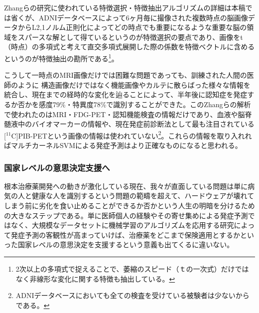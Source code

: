 Zhangらの研究に使われている特徴選択・特徴抽出アルゴリズムの詳細は本稿では省くが、ADNIデータベースによって6ヶ月毎に撮像された複数時点の脳画像データからL2,1ノルム正則化によってどの時点でも重要になるような重要な脳の領域をスパースな解として得ているというのが特徴選択の要点であり、画像をt（時点）の多項式と考えて直交多項式展開した際の係数を特徴ベクトルに含めるというのが特徴抽出の勘所である\footnote{2次以上の多項式で捉えることで、萎縮のスピード（ｔの一次式）だけではなく非線形な変化に関する特徴も抽出している。}。

こうして一時点のMRI画像だけでは困難な問題であっても、訓練された人間の医師のように
構造画像だけではなく機能画像やカルテに散らばった様々な情報を統合し、現在までの経時的な変化を辿ることによって、半年後に認知症を発症するか否かを感度79\%・特異度78\%で識別することができた。このZhangらの解析で使われたのはMRI・FDG-PET・認知機能検査の情報だけであり、血液や脳脊髄液中のバイオマーカーの情報や、現在発症前診断法として最も注目されている[$^{11}$C]PIB-PETという画像の情報は使われていない\footnote{ADNIデータベースにおいても全ての検査を受けている被験者は少ないからである。}。これらの情報を取り入れればマルチカーネルSVMによる発症予測はより正確なものになると思われる。

\subsubsection{国家レベルの意思決定支援へ}
根本治療薬開発への動きが激化している現在、我々が直面している問題は単に病気の人と健康な人を識別するという問題の範疇を超えて、ハードウェアが壊れてしまう前に劣化を食い止めることができるか否かという人生の明暗を分けるための大きなステップである。単に医師個人の経験やその寄せ集めによる発症予測ではなく、大規模なデータセットに機械学習のアルゴリズムを応用する研究によって発症予測の客観性が高まっていけば、治療薬をどこまで保険適用とするかといった国家レベルの意思決定を支援するという意義も出てくるに違いない。

%
%
%
%

